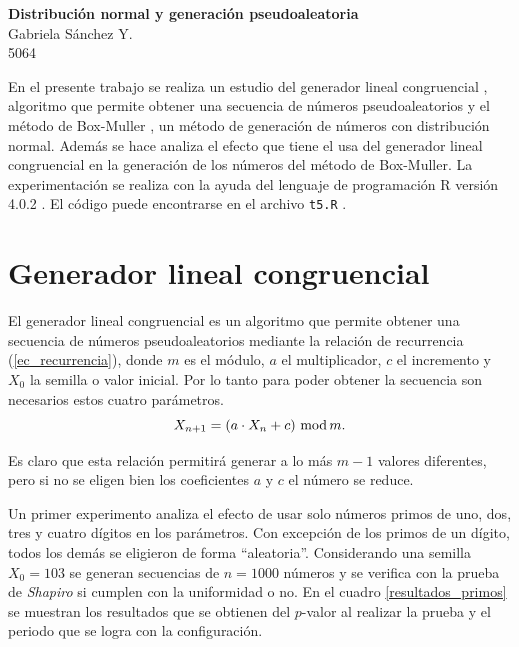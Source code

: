 \documentclass[12pt]{article}
\begin{document}
	\thispagestyle{empty}

	\begin{center}
		{\Large \bf Distribución normal y generación pseudoaleatoria}\\
		Gabriela S\'anchez Y.\\
		5064
	\end{center}
 
	En el presente trabajo se realiza un estudio del generador lineal congruencial \cite{wiki_lcg}, algoritmo que permite obtener una secuencia de números pseudoaleatorios y el método de Box-Muller \cite{wiki_bmt}, un método de generación de números con distribución normal. Además se hace analiza el efecto que tiene el usa del generador lineal congruencial en la generación de los números del método de Box-Muller. La experimentación se realiza con la ayuda del lenguaje de programación \textsc{R} versión 4.0.2 \cite{r}. El código puede encontrarse en el archivo \texttt{t5.R} \cite{mpa_gaby}.


	\section{Generador lineal congruencial}
	
	El generador lineal congruencial es un algoritmo que permite obtener una secuencia de números pseudoaleatorios mediante la relación de recurrencia (\ref{ec_recurrencia}), donde $m$ es el módulo, $a$ el multiplicador, $c$ el incremento y $X_0$ la semilla o valor inicial. Por lo tanto para poder obtener la secuencia son necesarios estos cuatro parámetros. 
	\begin{equation}
	X_{n+1} = \left(a\cdot X_n + c \right) \, \textup{mod} \, m.
	\label{ec_recurrencia}
	\end{equation}
	
	Es claro que esta relación permitirá generar a lo más $m-1$ valores diferentes, pero si no se eligen bien los coeficientes $a$ y $c$ el número se reduce.
	
	Un primer experimento analiza el efecto de usar solo números primos de uno, dos, tres y cuatro dígitos en los parámetros. Con excepción de los primos de un dígito, todos los demás se eligieron de forma ``aleatoria''. Considerando una semilla $X_0 = 103$ se generan secuencias de $n=1000$ números y se verifica con la prueba de {\em Shapiro} si cumplen con la uniformidad o no. En el cuadro \ref{resultados_primos} se muestran los resultados que se obtienen del $p$-valor al realizar la prueba y el periodo que se logra con la configuración.
	
\end{document}
